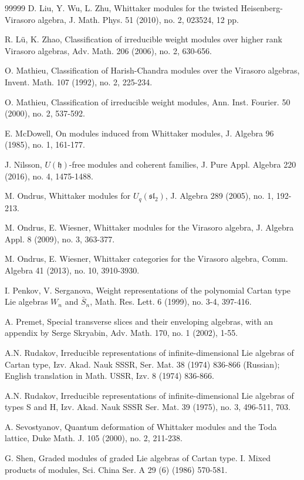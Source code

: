 \documentclass[12pt,a4paper]{amsart}
\def\mh{\mathfrak{h}}
\def\sl{\mathfrak{sl}}
\begin{document}
\begin{thebibliography}{99999}
 D. Liu, Y. Wu, L. Zhu, Whittaker modules for the twisted Heisenberg-Virasoro algebra, J. Math. Phys. 51 (2010), no. 2, 023524, 12 pp.

R. L\"{u}, K. Zhao, Classification of irreducible weight modules over higher rank Virasoro algebras, Adv. Math. 206 (2006), no. 2, 630-656.

O. Mathieu, Classification of Harish-Chandra modules over the Virasoro algebras, Invent. Math. 107 (1992), no. 2, 225-234.

 O. Mathieu, Classification of irreducible weight modules, Ann. Inst. Fourier. 50 (2000), no. 2, 537-592.

E. McDowell, On modules induced from Whittaker modules, J. Algebra 96 (1985), no. 1, 161-177.

J. Nilsson, $U(\mh)$-free modules and coherent families, J. Pure Appl. Algebra 220 (2016), no. 4, 1475-1488.

M. Ondrus, Whittaker modules for $U_q(\sl_2)$, J. Algebra 289 (2005), no. 1, 192-213.

M. Ondrus, E. Wiesner, Whittaker modules for the Virasoro algebra, J. Algebra Appl. 8 (2009), no. 3, 363-377.

M. Ondrus, E. Wiesner, Whittaker categories for the Virasoro algebra, Comm. Algebra 41 (2013), no. 10, 3910-3930.

I. Penkov, V. Serganova, Weight representations of the polynomial Cartan type Lie algebras $W_n$ and $\bar{S}_n$, Math. Res. Lett. 6 (1999), no. 3-4, 397-416.

  A. Premet, Special transverse slices and their enveloping algebras, with an appendix by Serge Skryabin, Adv. Math. 170, no. 1 (2002), 1-55.

A.N. Rudakov, Irreducible representations of infinite-dimensional Lie algebras of Cartan type, Izv. Akad. Nauk SSSR, Ser. Mat. 38 (1974) 836-866 (Russian); English translation in Math. USSR, Izv. 8 (1974) 836-866.

A.N. Rudakov, Irreducible representations of infinite-dimensional Lie algebras of types S and H, Izv. Akad. Nauk SSSR Ser. Mat. 39 (1975), no. 3, 496-511, 703.

A. Sevostyanov, Quantum deformation of Whittaker modules and the Toda lattice, Duke Math. J. 105 (2000), no. 2, 211-238.

G. Shen, Graded modules of graded Lie algebras of Cartan type. I. Mixed products of modules, Sci. China Ser. A 29 (6) (1986) 570-581.


\end{thebibliography}
\end{document}

